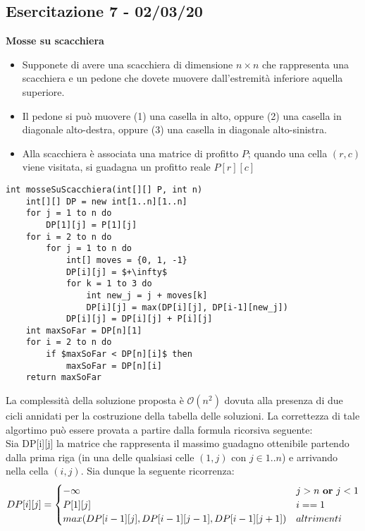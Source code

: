 \documentclass[../cheatSheetAlgoritmi.tex]{subfiles}
\begin{document}
\subsection{Esercitazione 7 - 02/03/20}
\textbf{Mosse su scacchiera}
\begin{itemize}
	\item Supponete di avere una scacchiera di dimensione $n \times n$ che rappresenta una scacchiera e un pedone che dovete muovere dall’estremità inferiore aquella superiore.
	\item Il pedone si può muovere (1) una casella in alto, oppure (2) una casella in diagonale alto-destra, oppure (3) una casella in diagonale alto-sinistra.
	\item Alla scacchiera è associata una matrice di profitto $P$; quando una cella $(r, c)$ viene visitata, si guadagna un profitto reale $P[r][c]$
\end{itemize}
\begin{lstlisting}[caption=Mosse su scacchiera]
int mosseSuScacchiera(int[][] P, int n)
    int[][] DP = new int[1..n][1..n]
    for j = 1 to n do
        DP[1][j] = P[1][j]
    for i = 2 to n do
        for j = 1 to n do
            int[] moves = {0, 1, -1}
            DP[i][j] = $+\infty$
            for k = 1 to 3 do
                int new_j = j + moves[k]
                DP[i][j] = max(DP[i][j], DP[i-1][new_j])
            DP[i][j] = DP[i][j] + P[i][j]
    int maxSoFar = DP[n][1]
    for i = 2 to n do
        if $maxSoFar < DP[n][i]$ then
            maxSoFar = DP[n][i]
    return maxSoFar
\end{lstlisting}
La complessità della soluzione proposta è $\mathcal{O}(n^2)$ dovuta alla presenza di due cicli annidati per la costruzione della tabella delle soluzioni. La correttezza di tale algortimo può essere provata a partire dalla formula ricorsiva seguente: \\
Sia DP[i][j] la matrice che rappresenta il massimo guadagno ottenibile partendo dalla prima riga (in una delle qualsiasi celle $(1, j)$ con $j \in {1..n}$) e arrivando nella cella $(i, j)$. Sia dunque la seguente ricorrenza:
\begin{equation*}
  	DP[i][j] =\begin{cases}
        -\infty & \text{$j > n$ \textbf{or} $j < 1$} \\
    	P[1][j] & \text{$i == 1$}\\
    	max(DP[i-1][j], DP[i-1][j-1], DP[i-1][j+1]) & \text{$altrimenti$}
  	\end{cases}
\end{equation*}
\end{document}
